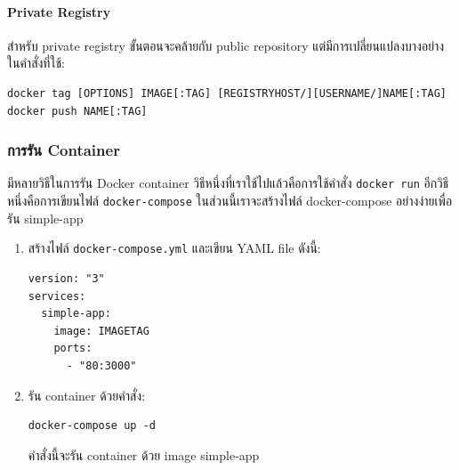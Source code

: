 \paragraph{Private Registry}
สำหรับ private registry ขั้นตอนจะคล้ายกับ public repository แต่มีการเปลี่ยนแปลงบางอย่างในคำสั่งที่ใช้:

\begin{verbatim}
docker tag [OPTIONS] IMAGE[:TAG] [REGISTRYHOST/][USERNAME/]NAME[:TAG]
docker push NAME[:TAG]
\end{verbatim}

\clearpage
\subsubsection{การรัน Container}

มีหลายวิธีในการรัน Docker container วิธีหนึ่งที่เราใช้ไปแล้วคือการใช้คำสั่ง \texttt{docker run} อีกวิธีหนึ่งคือการเขียนไฟล์ \texttt{docker-compose} ในส่วนนี้เราจะสร้างไฟล์ docker-compose อย่างง่ายเพื่อรัน simple-app

\begin{enumerate}
    \item สร้างไฟล์ \texttt{docker-compose.yml} และเขียน YAML file ดังนี้:
          \begin{verbatim}
version: "3"
services:
  simple-app:
    image: IMAGETAG
    ports:
      - "80:3000"
    \end{verbatim}

    \item รัน container ด้วยคำสั่ง:
          \begin{verbatim}
docker-compose up -d
    \end{verbatim}
          คำสั่งนี้จะรัน container ด้วย image simple-app
\end{enumerate}